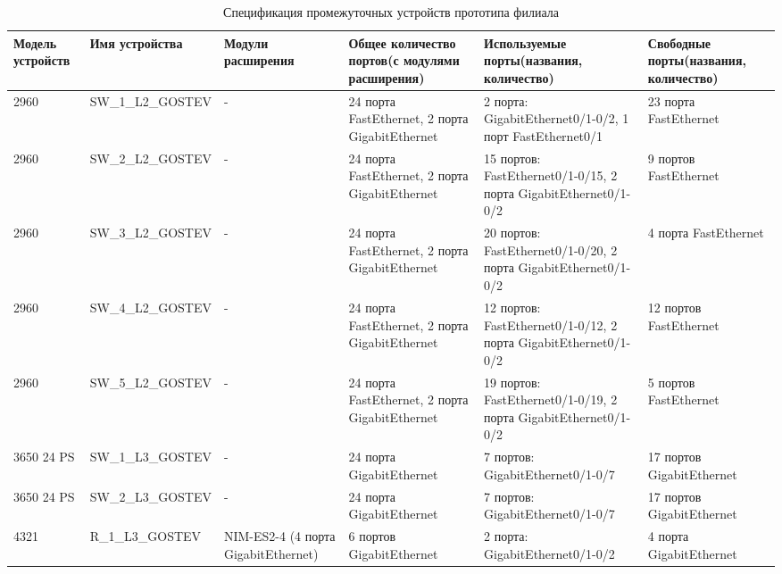 \documentclass[14pt, a4paper]{extarticle}
\numberwithin{equation}{section}
\begin{document}
\begin{landscape}
        

\begin{table}[H]
\centering
\small
\caption{Спецификация промежуточных устройств прототипа филиала}
\label{table:filialDevicesSpecs}
\begin{tabular}{|m{2.5cm}|m{4cm}|m{3cm}|m{4.2cm}|m{5.3cm}|m{4cm}|}
\hline
\textbf{Модель устройств} & \textbf{Имя устройства} & \textbf{Модули расширения} & \textbf{Общее количество портов(с модулями расширения)} & \textbf{Используемые порты(названия, количество)} & \textbf{Свободные порты(названия, количество)} \\
\hline
2960 & 
SW\_1\_L2\_GOSTEV & 
- & 
24 порта FastEthernet, 2 порта GigabitEthernet &
2 порта: GigabitEthernet0/1-0/2, 1 порт FastEthernet0/1 &
23 порта FastEthernet \\
\hline
2960 & 
SW\_2\_L2\_GOSTEV & 
- & 
24 порта FastEthernet, 2 порта GigabitEthernet & 
15 портов: FastEthernet0/1-0/15, 2 порта GigabitEthernet0/1-0/2 & 
9 портов FastEthernet \\
\hline
2960 &
SW\_3\_L2\_GOSTEV &
- &
24 порта FastEthernet, 2 порта GigabitEthernet &
20 портов: FastEthernet0/1-0/20, 2 порта GigabitEthernet0/1-0/2 &
4 порта FastEthernet \\
\hline
2960 &
SW\_4\_L2\_GOSTEV &
- &
24 порта FastEthernet, 2 порта GigabitEthernet &
12 портов: FastEthernet0/1-0/12, 2 порта GigabitEthernet0/1-0/2 &
12 портов FastEthernet \\
\hline
2960 &
SW\_5\_L2\_GOSTEV &
- &
24 порта FastEthernet, 2 порта GigabitEthernet &
19 портов: FastEthernet0/1-0/19, 2 порта GigabitEthernet0/1-0/2 &
5 портов FastEthernet \\
\hline
3650 24 PS &
SW\_1\_L3\_GOSTEV &
- &
24 порта GigabitEthernet &
7 портов: GigabitEthernet0/1-0/7 &
17 портов GigabitEthernet \\
\hline
3650 24 PS &
SW\_2\_L3\_GOSTEV &
- &
24 порта GigabitEthernet &
7 портов: GigabitEthernet0/1-0/7 &
17 портов GigabitEthernet \\
\hline
4321 &
R\_1\_L3\_GOSTEV &
NIM-ES2-4 (4 порта GigabitEthernet) &
6 портов GigabitEthernet &
2 порта: GigabitEthernet0/1-0/2 &
4 порта GigabitEthernet \\
\hline
\end{tabular}
\end{table}
\end{landscape}
\end{document}
